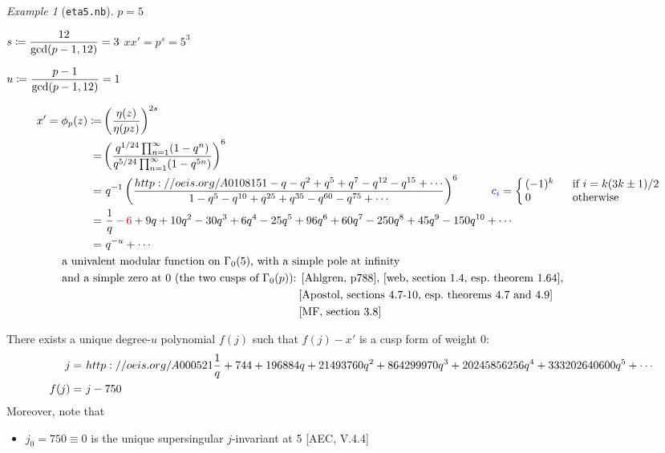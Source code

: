 \documentclass{rs}
\theoremstyle{definition}
\theoremstyle{remark}
\newtheorem{ex}[thm]{Example}
\renewcommand{\gcd}{{\rm gcd}}
\newcommand{\G}{\Gamma}
\newcommand{\ce}{\coloneqq}
\renewcommand{\=}{\approx}
\renewcommand{\-}{\sim}
\newcommand{\rd}[1]{\textcolor{red}{#1}}
\newcommand{\bl}[1]{\textcolor{blue}{#1}}
\numberwithin{equation}{section}
\numberwithin{thm}{section}
\begin{document}
\begin{ex}[\texttt{eta5.nb}]
 $p = 5$ 

 $s \ce \dfrac{12}{\gcd(p - 1, 12)} = 3$ \qquad $x x' = p^s = 5^3$ 

 $u \ce \dfrac{p - 1}{\gcd(p - 1, 12)} = 1$ 

 \begin{equation*}
  \begin{split}
   x' = \phi_p(z) \ce & \left( \frac{\eta(z)}{\eta(p z)} \right)^{2 s} \\
                    = & \left( \frac{q^{1/24} \prod_{n = 1}^\infty (1 - q^n)}{q^{5/24} \prod_{n = 1}^\infty (1 - q^{5 n})} \right)^6 \\
                    = & ~ q^{-1} \left( \frac{\href{http://oeis.org/A010815}{1 - q - q^2 + q^5 + q^7 - q^{12} - q^{15} + \cdots}}{1 - q^5 - q^{10} + q^{25} + q^{35} - q^{60} - q^{75} + \cdots} \right)^6 
                        \hskip 1cm \bl{c_i} = \left\{
                        \begin{array}{ll}
                         \!\! (-1)^k & ~~ \text{if $i = k (3 k \pm 1) / 2$} \\
                         \!\! 0 & ~~ \text{otherwise} 
                        \end{array}
                        \right. \\
                    = & ~ \frac{1}{q} \, \rd{- \, 6} + 9 q + 10 q^2 - 30 q^3 + 6 q^4 -25 q^5 + 96 q^6 + 60 q^7 - 250 q^8 + 45 q^9 - 150 q^{10} + \cdots \\
                    = & ~ q^{-u} + \cdots \\
                      & \hskip -1.25cm \text{a univalent modular function on $\G_0(5)$, with a simple pole at infinity} \\
                      & \hskip -1.25cm \text{and a simple zero at 0 (the two cusps of $\G_0(p)$): [Ahlgren, p788], [web, section 1.4, esp.~theorem 1.64],} \\
                      & \hskip 6.17cm \text{[Apostol, sections 4.7-10, esp.~theorems 4.7 and 4.9]} \\
                      & \hskip 6.17cm \text{[MF, section 3.8]} 
  \end{split}
 \end{equation*}

 There exists a unique degree-$u$ polynomial $f(j)$ such that $f(j) - x'$ is a cusp form of weight 0: 
 \begin{equation*}
  \begin{split}
      j = & ~ \relax{http://oeis.org/A000521}{\dfrac{1}{q} + 744 + 196884 q + 21493760 q^2 + 864299970 q^3 + 20245856256 q^4 + 333202640600 q^5 + \cdots} \\
   f(j) = & ~ j - 750 
  \end{split}
 \end{equation*}
 Moreover, note that 
 \begin{itemize}
  \item $j_0 = 750 \equiv 0$ is the unique supersingular $j$-invariant at 5 [AEC, V.4.4] 


\end{itemize}
\end{ex}
\end{document}
